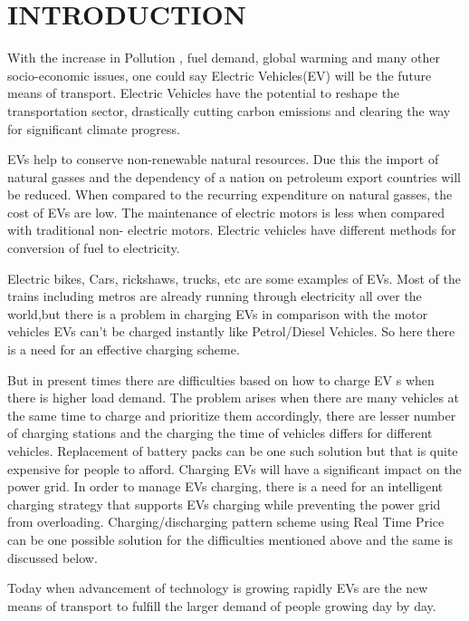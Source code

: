 	\chapter{INTRODUCTION}
	\label{chap:intro}
	
	
	With the increase in Pollution , fuel demand, global warming and many other socio-economic issues, one could say Electric Vehicles(EV) will be the future means of transport.  Electric Vehicles have the potential to reshape the transportation sector, drastically cutting carbon emissions and clearing the way
	for significant climate progress. 
	
	\noindent EVs help to conserve non-renewable natural resources. Due
	this the import of natural gasses and the dependency of a nation on petroleum export countries
	will be reduced. When compared to the recurring expenditure on natural gasses, the cost of
	EVs are low. The maintenance of electric motors is less when compared with traditional non-
	electric motors. Electric vehicles have different methods for conversion of fuel to electricity.
	
	
	
	\noindent Electric bikes, Cars, rickshaws, trucks, etc are some examples of EVs. Most of the trains including metros are already running through electricity all over the world,but there is a problem in charging EVs in comparison with the motor vehicles EVs can't be charged instantly like Petrol/Diesel Vehicles. 
	So here there is a need for an effective charging scheme.
	
	\noindent But in present times there are difficulties based on how to charge EV s when there is higher
	load demand. The problem arises when there are many vehicles at the same time to charge
	and prioritize them accordingly, there are lesser number of charging stations and the charging
	the time of vehicles differs for different vehicles. Replacement of battery packs can be one such
	solution but that is quite expensive for people to afford. Charging EVs will have a significant
	impact on the power grid. In order to manage EVs charging, there is a need for an intelligent
	charging strategy that supports EVs charging while preventing the power grid from
	overloading. Charging/discharging pattern scheme using Real Time Price can be one possible
	solution for the difficulties mentioned above and the same is discussed below.
	
	\noindent Today when advancement of technology is growing rapidly EVs are the new means of transport to fulfill the larger demand of people growing day by day.
	
